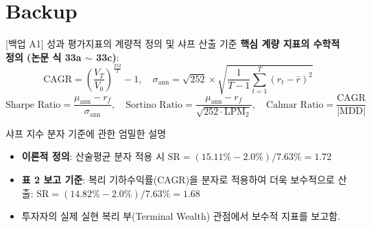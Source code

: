 \section{Backup}

\begin{frame}{[백업 A1] 성과 평가지표의 계량적 정의 및 샤프 산출 기준}
\textbf{핵심 계량 지표의 수학적 정의 (논문 식 33a $\sim$ 33c)}:
\begin{equation*}
  \text{CAGR} = \left(\frac{V_T}{V_0}\right)^{\frac{252}{T}} - 1, \quad
  \sigma_{\text{ann}} = \sqrt{252} \times \sqrt{\frac{1}{T-1}\sum_{t=1}^T (r_t - \bar{r})^2}
\end{equation*}
\begin{equation*}
  \text{Sharpe Ratio} = \frac{\mu_{\text{ann}} - r_f}{\sigma_{\text{ann}}}, \quad
  \text{Sortino Ratio} = \frac{\mu_{\text{ann}} - r_f}{\sqrt{252 \cdot \text{LPM}_2}}, \quad
  \text{Calmar Ratio} = \frac{\text{CAGR}}{|\text{MDD}|}
\end{equation*}

\vspace{1mm}
\begin{block}{샤프 지수 분자 기준에 관한 엄밀한 설명}
  \small
  \begin{itemize}
    \item \textbf{이론적 정의}: 산술평균 분자 적용 시 $\text{SR} = (15.11\% - 2.0\%) / 7.63\% = \mathbf{1.72}$
    \item \textbf{표 2 보고 기준}: 복리 기하수익률(CAGR)을 분자로 적용하여 더욱 보수적으로 산출:
    $\text{SR} = (14.82\% - 2.0\%) / 7.63\% = \mathbf{1.68}$
    \item 투자자의 실제 실현 복리 부(Terminal Wealth) 관점에서 보수적 지표를 보고함.
  \end{itemize}
\end{block}
\end{frame}

